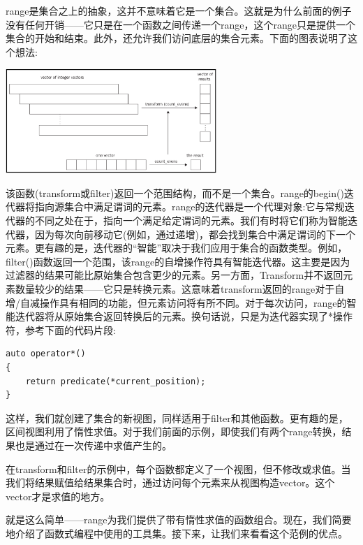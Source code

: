range是集合之上的抽象，这并不意味着它是一个集合。这就是为什么前面的例子没有任何开销——它只是在一个函数之间传递一个range，这个range只是提供一个集合的开始和结束。此外，还允许我们访问底层的集合元素。下面的图表说明了这个想法: \par

\begin{center}
	\includegraphics[width=0.6\textwidth]{content/Section-2/Chapter-7/3}
\end{center}

该函数(transform或filter)返回一个范围结构，而不是一个集合。range的begin()迭代器将指向源集合中满足谓词的元素。range的迭代器是一个代理对象:它与常规迭代器的不同之处在于，指向一个满足给定谓词的元素。我们有时将它们称为智能迭代器，因为每次向前移动它(例如，通过递增)，都会找到集合中满足谓词的下一个元素。更有趣的是，迭代器的“智能”取决于我们应用于集合的函数类型。例如，filter()函数返回一个范围，该range的自增操作符具有智能迭代器。这主要是因为过滤器的结果可能比原始集合包含更少的元素。另一方面，Transform并不返回元素数量较少的结果——它只是转换元素。这意味着transform返回的range对于自增/自减操作具有相同的功能，但元素访问将有所不同。对于每次访问，range的智能迭代器将从原始集合返回转换后的元素。换句话说，只是为迭代器实现了*操作符，参考下面的代码片段: \par

\begin{lstlisting}[caption={}]
auto operator*()
{
	return predicate(*current_position);
}
\end{lstlisting}

这样，我们就创建了集合的新视图，同样适用于filter和其他函数。更有趣的是，区间视图利用了惰性求值。对于我们前面的示例，即使我们有两个range转换，结果也是通过在一次传递中求值产生的。\par
在transform和filter的示例中，每个函数都定义了一个视图，但不修改或求值。当我们将结果赋值给结果集合时，通过访问每个元素来从视图构造vector。这个vector才是求值的地方。 \par
就是这么简单——range为我们提供了带有惰性求值的函数组合。现在，我们简要地介绍了函数式编程中使用的工具集。接下来，让我们来看看这个范例的优点。 \par

